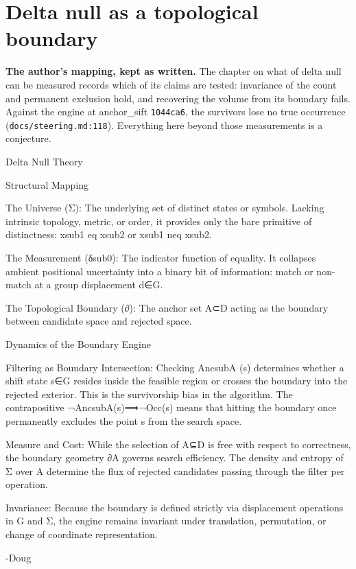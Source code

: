 \chapter{Delta null as a topological boundary}

\noindent\textbf{The author's mapping, kept as written.} The chapter on what of delta null can be measured records which of its claims are tested: invariance of the count and permanent exclusion hold, and recovering the volume from its boundary fails. Against the engine at anchor\_sift \texttt{1044ca6}, the survivors lose no true occurrence (\texttt{docs/\allowbreak{}steering.md:118}). Everything here beyond those measurements is a conjecture.

Delta Null Theory

Structural Mapping

The Universe (Σ): The underlying set of distinct states or symbols. Lacking intrinsic topology, metric, or order, it provides only the bare primitive of distinctness: xsub1 eq xsub2 or xsub1 neq xsub2.

The Measurement (δsub0): The indicator function of equality. It collapses ambient positional uncertainty into a binary bit of information: match or non-match at a group displacement d∈G.

The Topological Boundary (∂): The anchor set A⊂D acting as the boundary between candidate space and rejected space.

Dynamics of the Boundary Engine

Filtering as Boundary Intersection: Checking AncsubA (s) determines whether a shift state s∈G resides inside the feasible region or crosses the boundary into the rejected exterior. This is the survivorship bias in the algorithm. The contrapositive ¬AncsubA(s)⟹¬Occ(s) means that hitting the boundary once permanently excludes the point s from the search space.

Measure and Cost: While the selection of A⊆D is free with respect to correctness, the boundary geometry ∂A governs search efficiency. The density and entropy of Σ over A determine the flux of rejected candidates passing through the filter per operation.

Invariance: Because the boundary is defined strictly via displacement operations in G and Σ, the engine remains invariant under translation, permutation, or change of coordinate representation.

-Doug

